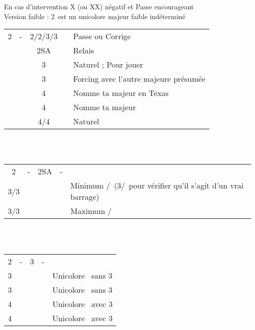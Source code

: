 \documentclass[a4paper, oneside, 11pt]{report}
\begin{document}
	En cas d'intervention X (ou XX) négatif et Passe encourageant\\	

	Version faible : 2\carreau\ est un unicolore majeur faible indéterminé\\

	\begin{tabular}{cccc|l}
	2\carreau & - & 2\coeur/2\pique/3\coeur/3\pique && Passe ou Corrige\\
	&& 2SA && Relais\\
	&& 3\trefle && Naturel ; Pour jouer\\
	&& 3\carreau && Forcing avec l'autre majeure présumée\\
	&& 4\trefle && Nomme ta majeur en Texas\\
	&& 4\carreau && Nomme ta majeur\\
	&& 4\coeur/4\pique && Naturel\\
	\end{tabular}\\\\

	\begin{tabular}{cccc|l}
	2\carreau & - & 2SA & - &\\
	3\trefle/3\carreau &&&& Minimum \coeur/\pique\ (3\carreau/\coeur\ pour vérifier qu'il s'agit d'un vrai barrage)\\
	3\coeur/3\pique &&&& Maximum \pique/\coeur\\
	\end{tabular}\\\\
	
	\begin{tabular}{cccc|l}
	2\carreau & - & 3\carreau & - &\\
	3\coeur &&&& Unicolore \coeur\ sans 3\pique\\
	3\pique &&&& Unicolore \pique\ sans 3\coeur\\
	4\trefle &&&& Unicolore \coeur\ avec 3\pique\\
	4\carreau &&&& Unicolore \pique\ avec 3\coeur\\
	\end{tabular}\\\\
\end{document}
